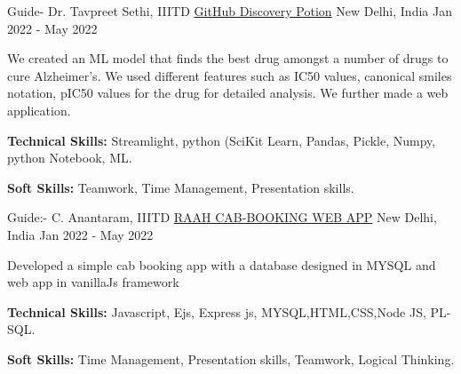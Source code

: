 

\begin{cventries}

  \cventry
    {Guide- Dr. Tavpreet Sethi, IIITD} %
    {\href{https://github.com/Abdul-Aziz-Mustafa/Discovery-Potion}{GitHub Discovery Potion}} %
    {New Delhi, India} %
    {Jan 2022 - May 2022} %
    {
      \begin{cvitems} %
        \item {We created an ML model that finds the best drug amongst a
number of drugs to cure Alzheimer's. We used different features
such as IC50 values, canonical smiles notation, pIC50 values for
the drug for detailed analysis. We further made a web
application.}
        \item {\textbf{Technical Skills:} Streamlight, python (SciKit Learn, Pandas, Pickle, Numpy, python Notebook, ML.}
        \item {\textbf{Soft Skills:} Teamwork, Time Management, Presentation skills.}
      \end{cvitems}
    }


  \cventry
    {Guide:- C. Anantaram, IIITD} %
    {\href{https://github.com/Abdul-Aziz-Mustafa/RAAH}{RAAH CAB-BOOKING WEB APP}} %
    {New Delhi, India} %
    {Jan 2022 - May 2022} %
    {
      \begin{cvitems} %
        \item {Developed a simple cab booking app with a database designed in MYSQL and web app in vanillaJs framework}
        \item {\textbf{Technical Skills:} Javascript, Ejs, Express js, MYSQL,HTML,CSS,Node JS, PL-SQL.}
        \item {\textbf{Soft Skills:} Time Management, Presentation skills, Teamwork, Logical Thinking.}
      \end{cvitems}
    }


\end{cventries}
